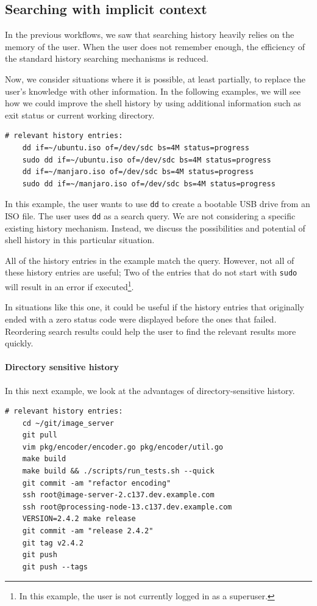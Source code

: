 \subsection{Searching with implicit context}\label{workflow-search-w-implicit-context}
In the previous workflows, we saw that searching history heavily relies on the memory of the user. When the user does not remember enough, the efficiency of the standard history searching mechanisms is reduced.

Now, we consider situations where it is possible, at least partially, to replace the user's knowledge with other information. In the following examples, we will see how we could improve the shell history by using additional information such as exit status or current working directory.

\begin{verbatim}
# relevant history entries:        
    dd if=~/ubuntu.iso of=/dev/sdc bs=4M status=progress
    sudo dd if=~/ubuntu.iso of=/dev/sdc bs=4M status=progress
    dd if=~/manjaro.iso of=/dev/sdc bs=4M status=progress
    sudo dd if=~/manjaro.iso of=/dev/sdc bs=4M status=progress
\end{verbatim}

In this example, the user wants to use \verb|dd| to create a bootable USB drive from an ISO file. The user uses \verb|dd| as a search query. We are not considering a specific existing history mechanism. Instead, we discuss the possibilities and potential of shell history in this particular situation.

All of the history entries in the example match the query. However, not all of these history entries are useful; Two of the entries that do not start with \verb|sudo| will result in an error if executed\footnote{In this example, the user is not currently logged in as a superuser.}. 

In situations like this one, it could be useful if the history entries that originally ended with a zero status code were displayed before the ones that failed. Reordering search results could help the user to find the relevant results more quickly. 

\paragraph{Directory sensitive history}

In this next example, we look at the advantages of directory-sensitive history.

\begin{verbatim}
# relevant history entries:
    cd ~/git/image_server
    git pull
    vim pkg/encoder/encoder.go pkg/encoder/util.go
    make build
    make build && ./scripts/run_tests.sh --quick
    git commit -am "refactor encoding"
    ssh root@image-server-2.c137.dev.example.com
    ssh root@processing-node-13.c137.dev.example.com
    VERSION=2.4.2 make release
    git commit -am "release 2.4.2"
    git tag v2.4.2
    git push
    git push --tags
\end{verbatim}

